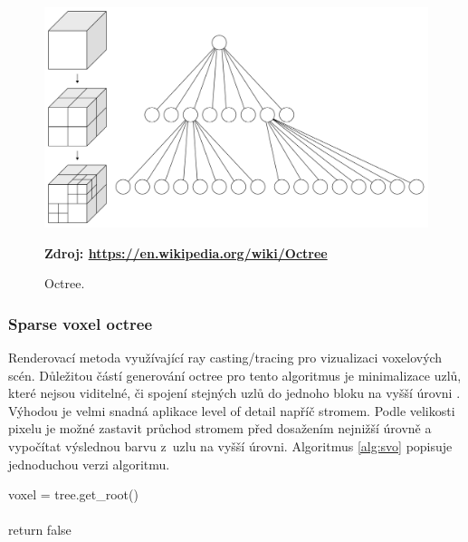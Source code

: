 \begin{figure}[H]
	\centering
	\includegraphics[scale=0.1]{obrazky-figures/Octree2.pdf}
	\caption{Octree.}
	\textbf{Zdroj: \url{https://en.wikipedia.org/wiki/Octree}}
	\label{fig:slabs}
\end{figure}


\subsubsection{Sparse voxel octree}\label{svo_alg}
Renderovací metoda využívající ray casting/tracing pro vizualizaci voxelových scén. Důležitou částí generování octree pro tento algoritmus je minimalizace uzlů, které nejsou viditelné, či spojení stejných uzlů do jednoho bloku na vyšší úrovni \cite{Laine2011EfficientSV}. Výhodou je velmi snadná aplikace level of detail napříč stromem. Podle velikosti pixelu je možné zastavit průchod stromem před dosažením nejnižší úrovně a vypočítat výslednou barvu z~uzlu na vyšší úrovni. Algoritmus \ref{alg:svo} popisuje jednoduchou verzi algoritmu.

\begin{center}
	\begin{czechalgorithm}[H] \label{alg:svo}
		voxel = tree.get\_root()\\
		\\
		return false
		\caption{Sparse voxel octree ray casting}
	\end{czechalgorithm}
\end{center}

